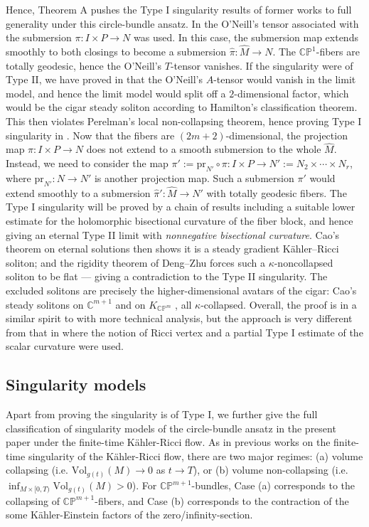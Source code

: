 \documentclass[11pt]{amsart}
\theoremstyle{plain}
\numberwithin{equation}{section}
\theoremstyle{definition}
\theoremstyle{remark}
\begin{document}
Hence, Theorem A pushes the Type I singularity results of former works \cite{F, S, GS, JST, FT} to full generality under this circle-bundle ansatz. In \cite{FT} the O'Neill's tensor associated with the submersion $\pi : I \times P \to N$ was used. In this case, the submersion map extends smoothly to both closings to become a submersion $\widehat{\pi} : \widehat{M} \to N$. The $\mathbb{CP}^1$-fibers are totally geodesic, hence the O'Neill's $T$-tensor vanishes. If the singularity were of Type II, we have proved in \cite{FT} that the O'Neill's $A$-tensor would vanish in the limit model, and hence the limit model would split off a $2$-dimensional factor, which would be the cigar steady soliton according to Hamilton's classification theorem. This then violates Perelman's local non-collapsing theorem, hence proving Type I singularity in \cite{FT}. Now that the fibers are $( 2 m + 2 )$-dimensional, the projection map $\pi : I \times P \to N$ does not extend to a smooth submersion to the whole $\widehat{M}$. Instead, we need to consider the map $\pi' := \textrm{pr}_{N'} \circ \pi : I \times P \to N' := N_2 \times \cdots \times N_r$, where $\textrm{pr}_{N'} : N \to N'$ is another projection map. Such a submersion $\pi'$ would extend smoothly to a submersion $\widehat{\pi}' : \widehat{M} \to N'$ with totally geodesic fibers. The Type I singularity will be proved by a chain of results including a suitable lower estimate for the holomorphic bisectional curvature of the fiber block, and hence giving an eternal Type II limit with \emph{nonnegative bisectional curvature}. Cao's theorem on eternal solutions \cite{Cao97} then shows it is a steady gradient K\"ahler--Ricci soliton; and the rigidity theorem of Deng--Zhu \cite{DZ18, DZ20} forces such a $\kappa$-noncollapsed soliton to be flat --- giving a contradiction to the Type II singularity. The excluded solitons are precisely the higher-dimensional avatars of the cigar: Cao's steady solitons on $\mathbb{C}^{m+1}$ and on $K_{\mathbb{CP}^m}$ \cite{Cao96}, all $\kappa$-collapsed. Overall, the proof is in a similar spirit to \cite{F, FT} with more technical analysis, but the approach is very different from that in \cite{JST} where the notion of Ricci vertex and a partial Type I estimate of the scalar curvature were used.

\subsection{Singularity models}

Apart from proving the singularity is of Type I, we further give the full classification of singularity models of the circle-bundle ansatz in the present paper under the finite-time K\"ahler-Ricci flow. As in previous works on the finite-time singularity of the K\"ahler-Ricci flow, there are two major regimes: (a) volume collapsing (i.e. $\textrm{Vol}_{g(t)}(M) \to 0$ as $t \to T$), or (b) volume non-collapsing (i.e. $\inf_{M \times [0,T)} \textrm{Vol}_{g(t)}(M) > 0$). For $\mathbb{CP}^{m+1}$-bundles, Case (a) corresponds to the collapsing of $\mathbb{CP}^{m+1}$-fibers, and Case (b) corresponds to the contraction of the some K\"ahler-Einstein factors of the zero/infinity-section.
\end{document}
